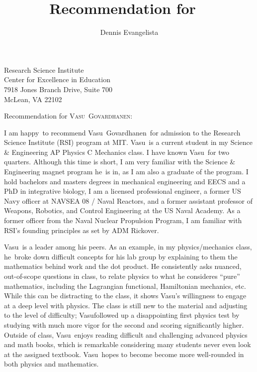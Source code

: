 \documentclass[10pt]{letter}
\title{Recommendation for \firstname\ \lastname}
\author{Dennis Evangelista}
\date{}
\newcommand\firstname{Vasu}
\newcommand\lastname{Govardhanen}
\newcommand\subject{he}
\newcommand\adjective{happy}
\begin{document}
\begin{letter}{%
Research Science Institute\\
Center for Excellence in Education\\
7918 Jones Branch Drive, Suite 700\\
McLean, VA 22102
}

\opening{Recommendation for {\scshape\firstname\ \lastname}:}

I am \adjective\ to recommend \firstname\ \lastname\ for admission to the Research Science Institute (RSI) program at MIT.  \firstname\ is a current student in my Science \& Engineering AP Physics C Mechanics class. I have known \firstname\ for two quarters. Although this time is short, I am very familiar with the Science \& Engineering magnet program \subject\ is in, as I am also a graduate of the program. I hold bachelors and masters degrees in mechanical engineering and EECS and a PhD in integrative biology, I am a licensed professional engineer, a former US Navy officer at NAVSEA 08 / Naval Reactors, and a former assistant professor of Weapons, Robotics, and Control Engineering at the US Naval Academy. As a former officer from the Naval Nuclear Propulsion Program, I am familiar with RSI's founding principles as set by ADM Rickover. 

\firstname\ is a leader among his peers. As an example, in my physics/mechanics class, \subject\ broke down difficult concepts for his lab group by explaining to them the mathematics behind work and the dot product. He consistently asks nuanced, out-of-scope questions in class, to relate physics to what he consideres ``pure'' mathematics, including the Lagrangian functional, Hamiltonian mechanics, etc. While this can be distracting to the class, it shows \firstname's willingness to engage at a deep level with physics. The class is still new to the material and adjusting to the level of difficulty; \firstname followed up a disappointing first physics test by studying with much more vigor for the second and scoring significantly higher. Outside of class, \firstname\ enjoys reading difficult and challenging advanced physics and math books, which is remarkable considering many students never even look at the assigned textbook. \firstname\ hopes to become become more well-rounded in both physics and mathematics. 


\end{letter}
\end{document}
